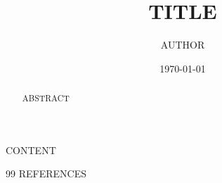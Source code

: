 \documentclass[11pt,a4paper]{article}
\title{{{TITLE}}}
\author{{{AUTHOR}}}
\date{\today}
\begin{document}
\maketitle
\begin{abstract}
{{ABSTRACT}}
\end{abstract}

\newpage
\tableofcontents
\newpage

{{CONTENT}}

\newpage
\begin{thebibliography}{99}
{{REFERENCES}}
\end{thebibliography}
\end{document}
